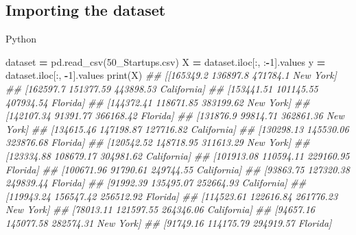 \documentclass[
]{book}
\newenvironment{Shaded}{\begin{snugshade}}{\end{snugshade}}
\newcommand{\BuiltInTok}[1]{#1}
\newcommand{\CommentTok}[1]{\textcolor[rgb]{0.56,0.35,0.01}{\textit{#1}}}
\newcommand{\DecValTok}[1]{\textcolor[rgb]{0.00,0.00,0.81}{#1}}
\newcommand{\NormalTok}[1]{#1}
\newcommand{\OperatorTok}[1]{\textcolor[rgb]{0.81,0.36,0.00}{\textbf{#1}}}
\newcommand{\StringTok}[1]{\textcolor[rgb]{0.31,0.60,0.02}{#1}}
\theoremstyle{definition}
\theoremstyle{definition}
\theoremstyle{definition}
\theoremstyle{definition}
\theoremstyle{remark}
\begin{document}
\hypertarget{importing-the-dataset-2}{%
\subsection{Importing the dataset}\label{importing-the-dataset-2}}

Python

\begin{Shaded}
\begin{Highlighting}[]
\NormalTok{dataset }\OperatorTok{=}\NormalTok{ pd.read\_csv(}\StringTok{\textquotesingle{}50\_Startups.csv\textquotesingle{}}\NormalTok{)}
\NormalTok{X }\OperatorTok{=}\NormalTok{ dataset.iloc[:, :}\OperatorTok{{-}}\DecValTok{1}\NormalTok{].values}
\NormalTok{y }\OperatorTok{=}\NormalTok{ dataset.iloc[:, }\OperatorTok{{-}}\DecValTok{1}\NormalTok{].values}
\BuiltInTok{print}\NormalTok{(X)}
\CommentTok{\#\# [[165349.2 136897.8 471784.1 \textquotesingle{}New York\textquotesingle{}]}
\CommentTok{\#\#  [162597.7 151377.59 443898.53 \textquotesingle{}California\textquotesingle{}]}
\CommentTok{\#\#  [153441.51 101145.55 407934.54 \textquotesingle{}Florida\textquotesingle{}]}
\CommentTok{\#\#  [144372.41 118671.85 383199.62 \textquotesingle{}New York\textquotesingle{}]}
\CommentTok{\#\#  [142107.34 91391.77 366168.42 \textquotesingle{}Florida\textquotesingle{}]}
\CommentTok{\#\#  [131876.9 99814.71 362861.36 \textquotesingle{}New York\textquotesingle{}]}
\CommentTok{\#\#  [134615.46 147198.87 127716.82 \textquotesingle{}California\textquotesingle{}]}
\CommentTok{\#\#  [130298.13 145530.06 323876.68 \textquotesingle{}Florida\textquotesingle{}]}
\CommentTok{\#\#  [120542.52 148718.95 311613.29 \textquotesingle{}New York\textquotesingle{}]}
\CommentTok{\#\#  [123334.88 108679.17 304981.62 \textquotesingle{}California\textquotesingle{}]}
\CommentTok{\#\#  [101913.08 110594.11 229160.95 \textquotesingle{}Florida\textquotesingle{}]}
\CommentTok{\#\#  [100671.96 91790.61 249744.55 \textquotesingle{}California\textquotesingle{}]}
\CommentTok{\#\#  [93863.75 127320.38 249839.44 \textquotesingle{}Florida\textquotesingle{}]}
\CommentTok{\#\#  [91992.39 135495.07 252664.93 \textquotesingle{}California\textquotesingle{}]}
\CommentTok{\#\#  [119943.24 156547.42 256512.92 \textquotesingle{}Florida\textquotesingle{}]}
\CommentTok{\#\#  [114523.61 122616.84 261776.23 \textquotesingle{}New York\textquotesingle{}]}
\CommentTok{\#\#  [78013.11 121597.55 264346.06 \textquotesingle{}California\textquotesingle{}]}
\CommentTok{\#\#  [94657.16 145077.58 282574.31 \textquotesingle{}New York\textquotesingle{}]}
\CommentTok{\#\#  [91749.16 114175.79 294919.57 \textquotesingle{}Florida\textquotesingle{}]}

\end{Highlighting}
\end{Shaded}
\end{document}

